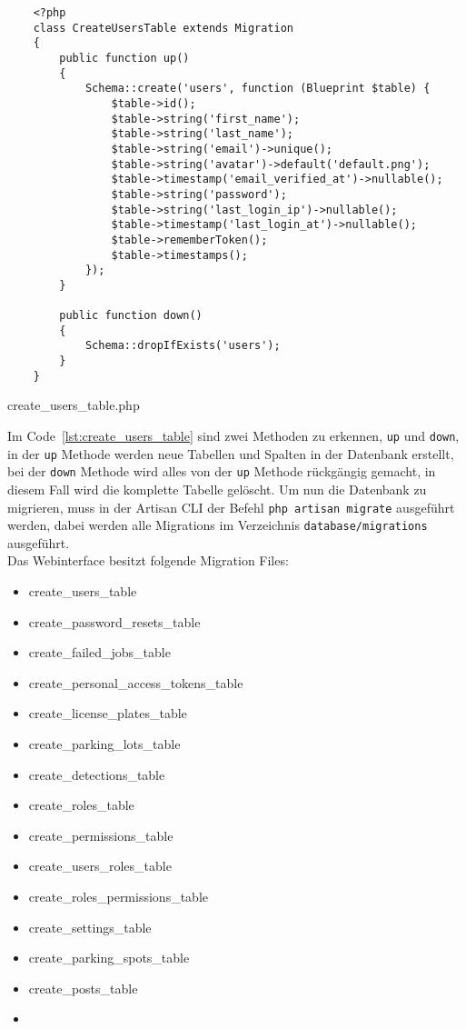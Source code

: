 \begin{listing}[H]
  \begin{verbatim}
    <?php
    class CreateUsersTable extends Migration
    {
        public function up()
        {
            Schema::create('users', function (Blueprint $table) {
                $table->id();
                $table->string('first_name');
                $table->string('last_name');
                $table->string('email')->unique();
                $table->string('avatar')->default('default.png');
                $table->timestamp('email_verified_at')->nullable();
                $table->string('password');
                $table->string('last_login_ip')->nullable();
                $table->timestamp('last_login_at')->nullable();
                $table->rememberToken();
                $table->timestamps();
            });
        }
    
        public function down()
        {
            Schema::dropIfExists('users');
        }
    }
  \end{verbatim}
  \caption{create\_users\_table.php}
  \label{lst:create_users_table}
\end{listing}

Im Code~\ref{lst:create_users_table} sind zwei Methoden zu erkennen, \verb|up|
und \verb|down|, in der \verb|up| Methode werden neue Tabellen und Spalten in
der Datenbank erstellt, bei der \verb|down| Methode wird alles von der \verb|up|
Methode rückgängig gemacht, in diesem Fall wird die komplette Tabelle gelöscht.
Um nun die Datenbank zu migrieren, muss in der Artisan \acs*{CLI} der Befehl
\verb|php artisan migrate| ausgeführt werden, dabei werden alle Migrations im
Verzeichnis \verb|database/migrations| ausgeführt.\\

Das Webinterface besitzt folgende Migration Files:

\begin{multicols}{2}
  \begin{itemize}
    \item create\_users\_table  \item create\_password\_resets\_table \item create\_failed\_jobs\_table \item create\_personal\_access\_tokens\_table
    \item create\_license\_plates\_table \item create\_parking\_lots\_table \item create\_detections\_table \item create\_roles\_table
    \item create\_permissions\_table \item create\_users\_roles\_table \item create\_roles\_permissions\_table  \item create\_settings\_table
    \item create\_parking\_spots\_table \item create\_posts\_table \item[\vspace{\fill}]
  \end{itemize}
\end{multicols}

